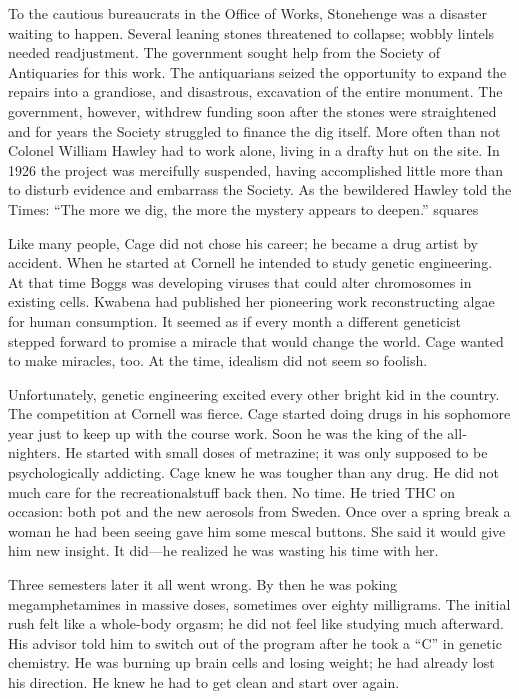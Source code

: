 To the cautious bureaucrats in the Office of Works, Stonehenge was a disaster waiting to happen. Several leaning stones threatened to collapse; wobbly lintels needed readjustment. The government sought help from the Society of Antiquaries for this work. The antiquarians seized the opportunity to expand the repairs into a grandiose, and disastrous, excavation of the entire monument. The government, however, withdrew funding soon after the stones were straightened and for years the Society struggled to finance the dig itself. More often than not Colonel William Hawley had to work alone, living in a drafty hut on the site. In 1926 the project was mercifully suspended, having accomplished little more than to disturb evidence and embarrass the Society. As the bewildered Hawley told the Times: “The more we dig, the more the mystery appears to deepen.”
squares

Like many people, Cage did not chose his career; he became a drug artist by accident. When he started at Cornell he intended to study genetic engineering. At that time Boggs was developing viruses that could alter chromosomes in existing cells. Kwabena had published her pioneering work reconstructing algae for human consumption. It seemed as if every month a different geneticist stepped forward to promise a miracle that would change the world. Cage wanted to make miracles, too. At the time, idealism did not seem so foolish.

Unfortunately, genetic engineering excited every other bright kid in the country. The competition at Cornell was fierce. Cage started doing drugs in his sophomore year just to keep up with the course work. Soon he was the king of the all-nighters. He started with small doses of metrazine; it was only supposed to be psychologically addicting. Cage knew he was tougher than any drug. He did not much care for the recreationalstuff back then. No time. He tried THC on occasion: both pot and the new aerosols from Sweden. Once over a spring break a woman he had been seeing gave him some mescal buttons. She said it would give him new insight. It did—he realized he was wasting his time with her.

Three semesters later it all went wrong. By then he was poking megamphetamines in massive doses, sometimes over eighty milligrams. The initial rush felt like a whole-body orgasm; he did not feel like studying much afterward. His advisor told him to switch out of the program after he took a “C” in genetic chemistry. He was burning up brain cells and losing weight; he had already lost his direction. He knew he had to get clean and start over again.

